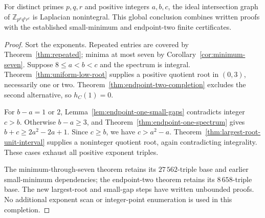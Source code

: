 \begin{theorem}
\label{thm:three-prime-classification}
For distinct primes $p,q,r$ and positive integers $a,b,c$, the ideal
intersection graph of $\mathbb Z_{p^a q^b r^c}$ is Laplacian nonintegral.
This global conclusion combines written proofs with the established
small-minimum and endpoint-two finite certificates.
\end{theorem}
\begin{proof}
Sort the exponents. Repeated entries are covered by
Theorem~\ref{thm:repeated}; minima at most seven by
Corollary~\ref{cor:minimum-seven}. Suppose $8\leq a<b<c$ and the
spectrum is integral. Theorem~\ref{thm:uniform-low-root} supplies a
positive quotient root in $(0,3)$, necessarily one or two.
Theorem~\ref{thm:endpoint-two-completion} excludes the second alternative,
so $h_C(1)=0$.

For $b-a=1$ or $2$, Lemma~\ref{lem:endpoint-one-small-gaps} contradicts
integer $c>b$. Otherwise $b-a\geq3$, and
Theorem~\ref{thm:endpoint-one-spectrum} gives
$b+c\geq2a^2-2a+1$. Since $c\geq b$, we have $c>a^2-a$.
Theorem~\ref{thm:largest-root-unit-interval} supplies a noninteger
quotient root, again contradicting integrality. These cases exhaust
all positive exponent triples.

The minimum-through-seven theorem retains its $27\,562$-triple base
and earlier small-minimum dependencies; the endpoint-two theorem
retains its $8\,658$-triple base. The new largest-root and small-gap
steps have written unbounded proofs. No additional exponent scan or
integer-point enumeration is used in this completion.
\end{proof}
